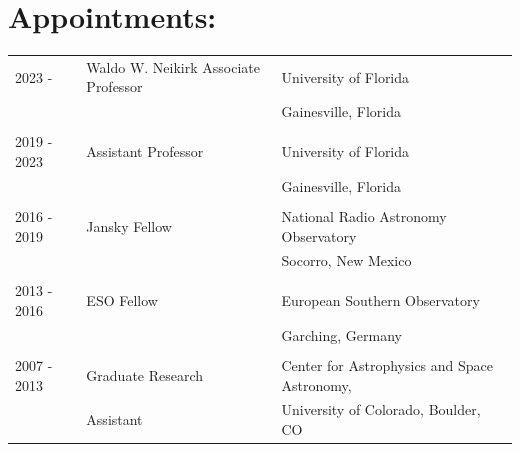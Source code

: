 \documentclass[12pt]{article}
\begin{document}
\section*{Appointments:}
\begin{listliketab}
    \begin{tabular}{p{1.0in}p{1.5in}p{4.5in}}
    2023 -      & Waldo W. Neikirk Associate Professor & University of Florida \\
                                     && Gainesville, Florida \\
                                     \smallskip \\
    2019 - 2023        & Assistant Professor & University of Florida \\
         &         & Gainesville, Florida \\
                                     \smallskip \\
    2016 - 2019     & Jansky Fellow  & National Radio Astronomy Observatory\\
         &         & Socorro, New Mexico \\
                                     \smallskip \\
    2013 - 2016      & ESO Fellow  & European Southern Observatory\\
        &         & Garching, Germany \\
                                     \smallskip \\
    2007 - 2013  & Graduate Research & Center for Astrophysics and Space Astronomy, \\
                 &   Assistant                & University of Colorado, Boulder, CO \\
    \end{tabular}
\end{listliketab}
\end{document}
